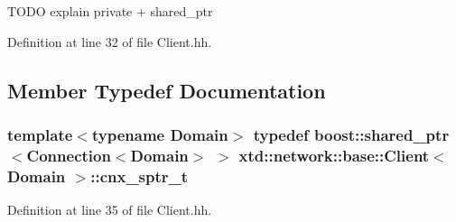 T\-O\-D\-O explain private + shared\-\_\-ptr 

Definition at line 32 of file Client.\-hh.



\subsection{Member Typedef Documentation}
\hypertarget{classxtd_1_1network_1_1base_1_1Client_a3cef8310676dac754d630bcc1628ab56}{
\subsubsection[{cnx\-\_\-sptr\-\_\-t}]{\setlength{\rightskip}{0pt plus 5cm}template$<$typename Domain$>$ typedef boost\-::shared\-\_\-ptr$<${\bf Connection}$<$Domain$>$ $>$ {\bf xtd\-::network\-::base\-::\-Client}$<$ Domain $>$\-::{\bf cnx\-\_\-sptr\-\_\-t}\hspace{0.3cm}{\ttfamily [protected]}}}\label{classxtd_1_1network_1_1base_1_1Client_a3cef8310676dac754d630bcc1628ab56}


Definition at line 35 of file Client.\-hh.



